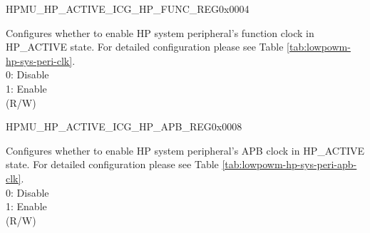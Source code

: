     \begin{register}{H}{PMU\_HP\_ACTIVE\_ICG\_HP\_FUNC\_REG}{0x0004}\label{regdesc:PMUHPACTIVEICGHPFUNCREG}
    \regnewline%
    \begin{regdesc}\begin{reglist}
    \label{fielddesc:PMUHPACTIVEDIGICGFUNCEN}\item [PMU\_HP\_ACTIVE\_DIG\_ICG\_FUNC\_EN] Configures whether to enable HP system peripheral's function clock in HP\_ACTIVE state. For detailed configuration please see Table \ref{tab:lowpowm-hp-sys-peri-clk}.\\
0: Disable\\
1: Enable\\
(R/W)
    \end{reglist}\end{regdesc}
    \end{register}


    \begin{register}{H}{PMU\_HP\_ACTIVE\_ICG\_HP\_APB\_REG}{0x0008}\label{regdesc:PMUHPACTIVEICGHPAPBREG}
    \regnewline%
    \begin{regdesc}\begin{reglist}
    \label{fielddesc:PMUHPACTIVEDIGICGAPBEN}\item [PMU\_HP\_ACTIVE\_DIG\_ICG\_APB\_EN] Configures whether to enable HP system peripheral's APB clock in HP\_ACTIVE state. For detailed configuration please see Table \ref{tab:lowpowm-hp-sys-peri-apb-clk}.\\
0: Disable\\
1: Enable\\
(R/W)
    \end{reglist}\end{regdesc}
    \end{register}




